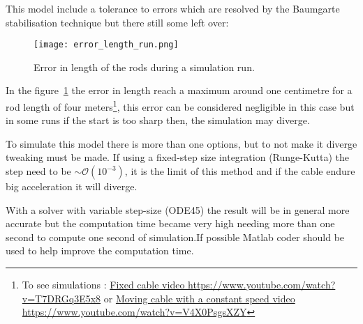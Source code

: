 This model include a tolerance to errors which are resolved by the Baumgarte stabilisation technique but there still some left over:


\begin{figure}[H]
\centering
    \texttt{[image: error\_length\_run.png]}
    \caption{Error in length of the rods during a simulation run.}
    \label{fig:errorLRod}
\end{figure}

In the figure~\ref{fig:errorLRod} the error in length reach a maximum around one centimetre for a rod length of four meters\footnote{To see simulations : \href{https://www.youtube.com/watch?v=T7DRGq3E5x8}{Fixed cable video https://www.youtube.com/watch?v=T7DRGq3E5x8} or \href{https://www.youtube.com/watch?v=V4X0PsgsXZY}{Moving cable with a constant speed video https://www.youtube.com/watch?v=V4X0PsgsXZY}}, this error can be considered negligible in this case but in some runs if the start is too sharp then, the simulation may diverge.

To simulate this model there is more than one options, but to not make it diverge tweaking must be made.
If using a fixed-step size integration (Runge-Kutta) the step need to be $\sim\mathcal{O}(10^{-3})$, it is the limit of this method and if the cable endure big acceleration it will diverge.

With a solver with variable step-size (ODE45) the result will be in general more accurate but the computation time became very high needing more than one second to compute one second of simulation.If possible Matlab coder should be used to help improve the computation time.
